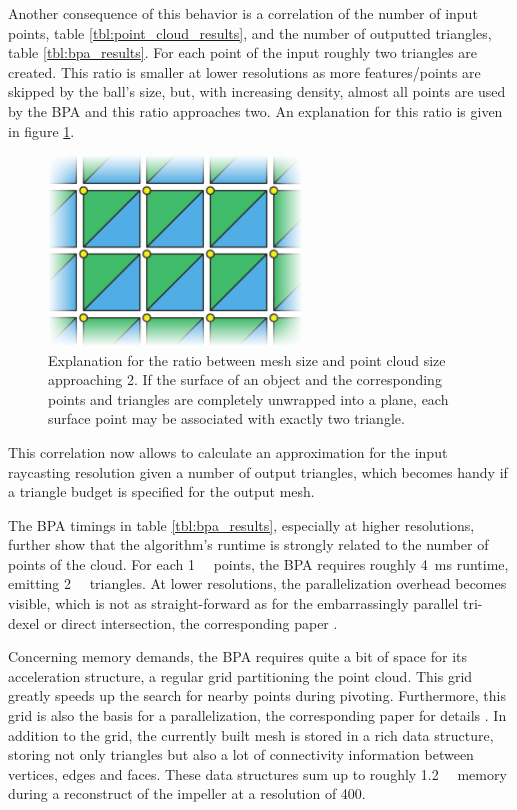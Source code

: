 Another consequence of this behavior is a correlation of the number of input points, \cf table \ref{tbl:point_cloud_results}, and the number of outputted triangles, \cf table \ref{tbl:bpa_results}.
For each point of the input roughly two triangles are created.
This ratio is smaller at lower resolutions as more features/points are skipped by the ball's size, but, with increasing density, almost all points are used by the BPA and this ratio approaches two.
An explanation for this ratio is given in figure \ref{fig:bpa_point_triangle_ratio}.
%
\begin{figure}
	\centering
	\includegraphics[width=0.6\textwidth]{images/bpa_point_triangle_ratio}
	\caption{
		Explanation for the ratio between mesh size and point cloud size approaching 2.
		If the surface of an object and the corresponding points and triangles are completely unwrapped into a plane, each surface point may be associated with exactly two triangle.
	}
	\label{fig:bpa_point_triangle_ratio}
\end{figure}
%
This correlation now allows to calculate an approximation for the input raycasting resolution given a number of output triangles, which becomes handy if a triangle budget is specified for the output mesh.

The BPA timings in table \ref{tbl:bpa_results}, especially at higher resolutions, further show that the algorithm's runtime is strongly related to the number of points of the cloud.
For each \SI{1}{\kilo\nothing} points, the BPA requires roughly \SI{4}{\milli\second} runtime, emitting \SI{2}{\kilo\nothing} triangles.
At lower resolutions, the parallelization overhead becomes visible, which is not as straight-forward as for the embarrassingly parallel tri-dexel or direct intersection, \cf the corresponding paper \cite{bpa_vml}.

Concerning memory demands, the BPA requires quite a bit of space for its acceleration structure, a regular grid partitioning the point cloud.
This grid greatly speeds up the search for nearby points during pivoting.
Furthermore, this grid is also the basis for a parallelization, \cf the corresponding paper for details \cite{bpa_vml}.
In addition to the grid, the currently built mesh is stored in a rich data structure, storing not only triangles but also a lot of connectivity information between vertices, edges and faces.
These data structures sum up to roughly \SI{1.2}{\gibi\byte} memory during a reconstruct of the impeller at a resolution of 400.

